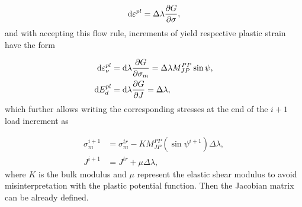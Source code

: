 \begin{equation}
	\dd \varepsilon^{pl} = \Delta \lambda \pdv{G}{\sigma},
\end{equation}
and with accepting this flow rule, increments of yield respective plastic strain have the form 

\begin{align}
	\dd \varepsilon_\nu^{pl} &= \dd \lambda \pdv{G}{\sigma_m} = \Delta \lambda M_{JP}^{PP} \sin \psi,\\
	\dd E_{d}^{pl} &= \dd \lambda \pdv{G}{J} = \Delta \lambda,
\end{align}
which further allows writing the corresponding stresses at the end of the $i+1$ load increment as  

\begin{align}
	\sigma_m^{i+1} &= \sigma_m^{tr} - K M_{JP}^{PP} (\sin \psi^{i+1}) \Delta \lambda,\\
	J^{i+1} &= J^{tr} + \mu \Delta \lambda,
\end{align}
where $K$ is the bulk modulus and $\mu$ represent the elastic shear modulus to avoid misinterpretation with the plastic potential function. Then the Jacobian matrix can be already defined.

